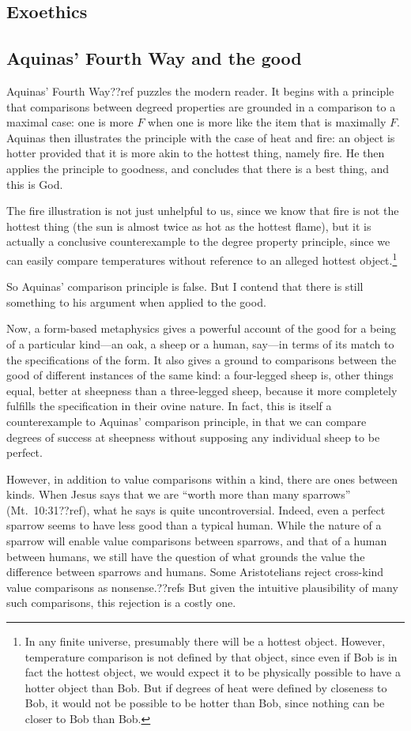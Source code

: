 \subsection{Exoethics}
\subsection{Aquinas' Fourth Way and the good}
Aquinas' Fourth Way??ref puzzles the modern reader. It begins with a principle that comparisons between
degreed properties are grounded in a comparison to a maximal case: one is more $F$ when one is more like
the item that is maximally $F$. Aquinas then illustrates the principle with the case of heat and fire:
an object is hotter provided that it is more akin to the hottest thing, namely fire. He then applies
the principle to goodness, and concludes that there is a best thing, and this is God.

The fire illustration is not just unhelpful to us, since we know that fire is not the hottest thing (the sun is almost
twice as hot as the hottest flame), but it is actually a conclusive counterexample to the degree property principle,
since we can easily compare temperatures without reference to an alleged hottest object.\footnote{In any finite universe,
presumably there will be a hottest object. However, temperature comparison is not defined by that object, since 
even if Bob is in fact the hottest object, we would expect it to be physically possible to have a hotter object 
than Bob. But if degrees of heat were defined by closeness to Bob, it would not be possible to be hotter than
Bob, since nothing can be closer to Bob than Bob.}

So Aquinas' comparison principle is false. But I contend that there is still something to his argument
when applied to the good. 

Now, a form-based metaphysics gives a powerful account of the good for a being of
a particular kind---an oak, a sheep or a human, say---in terms of its match to the specifications of the
form. It also gives a ground to comparisons between the good of different instances of the same kind:
a four-legged sheep is, other things equal, better at sheepness than a three-legged sheep, because it
more completely fulfills the specification in their ovine nature. In fact, this is itself a counterexample 
to Aquinas' comparison principle, in that we can compare degrees of success at sheepness without supposing
any individual sheep to be perfect.

However, in addition to value comparisons within a kind, there are ones between kinds. When Jesus says
that we are ``worth more than many sparrows'' (Mt.\ 10:31??ref), what he says is quite uncontroversial.
Indeed, even a perfect sparrow seems to have less good than a typical human. While the nature of a sparrow
will enable value comparisons between sparrows, and that of a human between humans, we still have the question
of what grounds the value the difference between sparrows and humans. Some Aristotelians reject cross-kind 
value comparisons as nonsense.??refs But given the intuitive plausibility of many such comparisons, this rejection
is a costly one.

